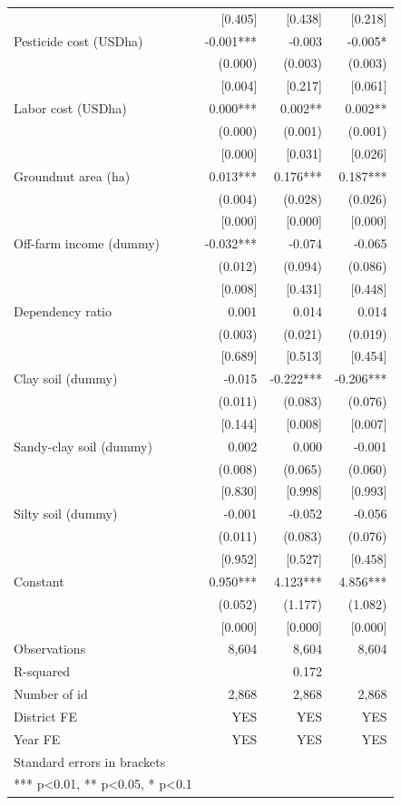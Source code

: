 \documentclass[
]{article}
\begin{document}
\begin{ThreePartTable}
\begin{longtable}[t]{lrrr}
 & {}[0.405] & {}[0.438] & {}[0.218]\\
Pesticide cost (USD\/ha) & -0.001*** & -0.003 & -0.005*\\
 & (0.000) & (0.003) & (0.003)\\
 & {}[0.004] & {}[0.217] & {}[0.061]\\
Labor cost (USD\/ha) & 0.000*** & 0.002** & 0.002**\\
 & (0.000) & (0.001) & (0.001)\\
 & {}[0.000] & {}[0.031] & {}[0.026]\\
Groundnut area (ha) & 0.013*** & 0.176*** & 0.187***\\
 & (0.004) & (0.028) & (0.026)\\
 & {}[0.000] & {}[0.000] & {}[0.000]\\
Off-farm income (dummy) & -0.032*** & -0.074 & -0.065\\
 & (0.012) & (0.094) & (0.086)\\
 & {}[0.008] & {}[0.431] & {}[0.448]\\
Dependency ratio & 0.001 & 0.014 & 0.014\\
 & (0.003) & (0.021) & (0.019)\\
 & {}[0.689] & {}[0.513] & {}[0.454]\\
Clay soil (dummy) & -0.015 & -0.222*** & -0.206***\\
 & (0.011) & (0.083) & (0.076)\\
 & {}[0.144] & {}[0.008] & {}[0.007]\\
Sandy-clay soil (dummy) & 0.002 & 0.000 & -0.001\\
 & (0.008) & (0.065) & (0.060)\\
 & {}[0.830] & {}[0.998] & {}[0.993]\\
Silty soil (dummy) & -0.001 & -0.052 & -0.056\\
 & (0.011) & (0.083) & (0.076)\\
 & {}[0.952] & {}[0.527] & {}[0.458]\\
Constant & 0.950*** & 4.123*** & 4.856***\\
 & (0.052) & (1.177) & (1.082)\\
 & {}[0.000] & {}[0.000] & {}[0.000]\\
Observations & 8,604 & 8,604 & 8,604\\
R-squared &  & 0.172 & \\
Number of id & 2,868 & 2,868 & 2,868\\
District FE & YES & YES & YES\\
Year FE & YES & YES & YES\\
Standard errors in brackets &  &  & \\
*** p<0.01, ** p<0.05, * p<0.1 &  &  & \\*
\end{longtable}
\end{ThreePartTable}
\endgroup{}
\end{document}
